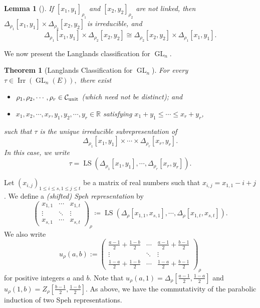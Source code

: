 \documentclass[11pt,letterpaper]{amsart}
\theoremstyle{plain}
\newcounter{theorem}[section]
\numberwithin{theorem}{section}
\numberwithin{equation}{subsection}
\newtheorem{Thm}[theorem]{Theorem}
\newtheorem{Lem}[theorem]{Lemma}
\theoremstyle{remark}
\newcommand{\GL}{\operatorname{GL}}
\newcommand{\Irr}{\operatorname{Irr}}
\newcommand{\LS}{\operatorname{LS}} %
\newcommand{\R}{\mathbb{R}}
\newcommand{\unit}{{\rm unit}}
\def\calC{\mathcal{C}}
\begin{document}
\begin{Lem}[{\cite[Thm. 4.2]{ZeleII}}]\label{linkedlemma}
    If \([x_1,y_1]_{\rho_1}\) and \([x_2,y_2]_{\rho_2}\) are not linked, then \(\Delta_{\rho_1}[x_1,y_1]\times\Delta_{\rho_2}[x_2,y_2]\) is irreducible, and 
    \[
        \Delta_{\rho_1}[x_1,y_1]\times\Delta_{\rho_2}[x_2,y_2]\cong \Delta_{\rho_2}[x_2,y_2]\times\Delta_{\rho_1}[x_1,y_1].
    \]
\end{Lem}

\vskip 5pt

We now present the Langlands classification for \(\GL_n.\)

\begin{Thm}[Langlands Classification for \(\GL_n\)]\label{T:LanglandsClass4GL}
For every \(\tau\in\Irr(\GL_n(E)),\) there exist
\begin{itemize}
    \item \(\rho_1,\rho_2,\cdots,\rho_r\in\calC_{\unit}\) (which need not be distinct); and

    \vskip 5pt

    \item \(x_1,x_2,\cdots,x_r,y_1,y_2,\cdots,y_r\in\R\) satisfying \(x_1+y_1\leq\cdots\leq x_r+y_r\),
\end{itemize}
such that \(\tau\) is the unique irreducible subrepresentation of
\[
    \Delta_{\rho_1}[x_1,y_1]\times\cdots\times\Delta_{\rho_r}[x_r,y_r].
\]
In this case, we write 
\[
    \tau=\LS(\Delta_{\rho_1}[x_1,y_1],\cdots,\Delta_{\rho_r}[x_r,y_r]).
\]
\end{Thm}

\vskip 5pt

Let \(\left(x_{i,j}\right)_{1\leq i\leq s,1\leq j\leq t}\) be a matrix of real numbers such that \(x_{i,j}=x_{1,1}-i+j\). We define a \emph{(shifted) Speh representation} by
\[
\begin{pmatrix}
    x_{1,1} & \cdots & x_{1,t}\\
    \vdots & \ddots & \vdots\\
    x_{s,1} & \cdots & x_{s,t}
\end{pmatrix}_{\rho} \coloneqq \LS(\Delta_{\rho}[x_{1,1},x_{s,1}],\cdots,\Delta_{\rho}[x_{1,t},x_{s,t}]).
\]
We also write
\[
u_{\rho}(a,b):=\begin{pmatrix}
    \frac{a-1}{2}+\frac{1-b}{2} & \cdots & \frac{a-1}{2}+\frac{b-1}{2}\\
    \vdots & \ddots & \vdots\\
    \frac{1-a}{2}+\frac{1-b}{2} & \cdots & \frac{1-a}{2}+\frac{b-1}{2}
\end{pmatrix}_{\rho}
\]
for positive integers \(a\) and \(b\). Note that \(u_{\rho}(a,1)=\Delta_{\rho}\left[\frac{a-1}{2},\frac{1-a}{2}\right]\) and \(u_{\rho}(1,b)=Z_{\rho}\left[\frac{b-1}{2},\frac{1-b}{2}\right]\). As above, we have the commutativity of the parabolic induction of two Speh representations.
\end{document}
